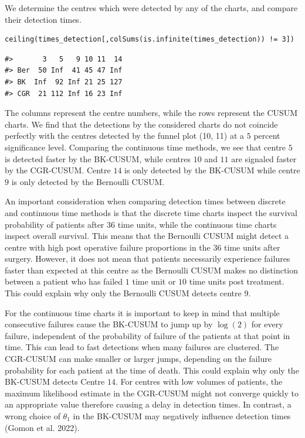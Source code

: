 We determine the centres which were detected by any of the charts, and compare their detection times.

\begin{verbatim}
ceiling(times_detection[,colSums(is.infinite(times_detection)) != 3])
\end{verbatim}

\begin{verbatim}
#>       3   5   9 10 11  14
#> Ber  50 Inf  41 45 47 Inf
#> BK  Inf  92 Inf 21 25 127
#> CGR  21 112 Inf 16 23 Inf
\end{verbatim}

The columns represent the centre numbers, while the rows represent the CUSUM charts. We find that the detections by the considered charts do not coincide perfectly with the centres detected by the funnel plot (10, 11) at a \(5\) percent significance level. Comparing the continuous time methods, we see that centre \(5\) is detected faster by the BK-CUSUM, while centres \(10\) and \(11\) are signaled faster by the CGR-CUSUM. Centre \(14\) is only detected by the BK-CUSUM while centre \(9\) is only detected by the Bernoulli CUSUM.

An important consideration when comparing detection times between discrete and continuous time methods is that the discrete time charts inspect the survival probability of patients after \(36\) time units, while the continuous time charts inspect overall survival. This means that the Bernoulli CUSUM might detect a centre with high post operative failure proportions in the \(36\) time units after surgery. However, it does not mean that patients necessarily experience failures faster than expected at this centre as the Bernoulli CUSUM makes no distinction between a patient who has failed \(1\) time unit or \(10\) time units post treatment. This could explain why only the Bernoulli CUSUM detects centre \(9\).

For the continuous time charts it is important to keep in mind that multiple consecutive failures cause the BK-CUSUM to jump up by \(\log(2)\) for every failure, independent of the probability of failure of the patients at that point in time. This can lead to fast detections when many failures are clustered. The CGR-CUSUM can make smaller or larger jumps, depending on the failure probability for each patient at the time of death. This could explain why only the BK-CUSUM detects Centre \(14\). For centres with low volumes of patients, the maximum likelihood estimate in the CGR-CUSUM might not converge quickly to an appropriate value therefore causing a delay in detection times. In contrast, a wrong choice of \(\theta_1\) in the BK-CUSUM may negatively influence detection times (Gomon et al. 2022).

